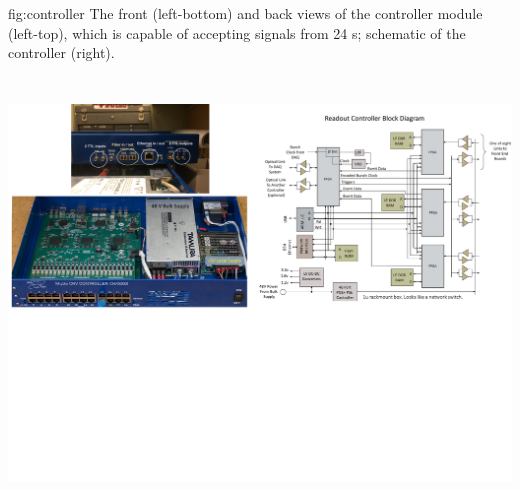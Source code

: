 \begin{dunefigure}
 {fig:controller}
 {The front (left-bottom) and back views of the controller module (left-top), which is capable of accepting signals from 24 s; schematic of the controller (right).}
\includegraphics[height=4.8in]{graphics/pds-controller.pdf} 
\vspace{-5.5cm}
\end{dunefigure}



